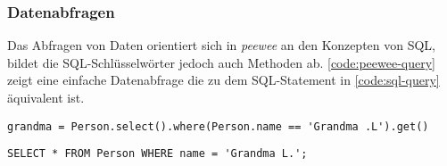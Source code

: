 \subsubsection*{Datenabfragen}

Das Abfragen von Daten orientiert sich in \emph{peewee} an den Konzepten von SQL, bildet die SQL-Schlüsselwörter jedoch auch Methoden ab. \autoref{code:peewee-query} zeigt eine einfache Datenabfrage die zu dem SQL-Statement in \autoref{code:sql-query} äquivalent ist.

\lstset{language=python}
\begin{lstlisting}[caption={Python-Code zum Abfragen eines Objektes aus der Datenbank.  \cite{noauthor_quickstart_2023}}, label=code:peewee-query]
    grandma = Person.select().where(Person.name == 'Grandma .L').get()
\end{lstlisting}

\lstset{language=sql}
\begin{lstlisting}[caption={SQL-Abfrage mit SELECT und WHERE.}, label=code:sql-query]
    SELECT * FROM Person WHERE name = 'Grandma L.';
\end{lstlisting}
